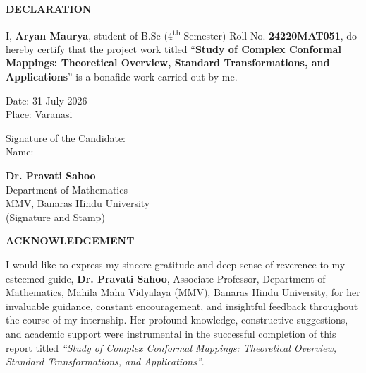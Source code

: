 \documentclass[12pt,a4paper]{article}
\begin{document}
\begin{center}
    {\Large \textbf{DECLARATION}}
\end{center}

\vspace{1.2cm}

\large

\noindent I, \textbf{Aryan Maurya}, student of B.Sc (4\textsuperscript{th} Semester) Roll No. \textbf{24220MAT051}, do hereby certify that the project work titled “\textbf{Study of Complex Conformal Mappings: Theoretical Overview, Standard Transformations, and Applications}” is a bonafide work carried out by me.

\vspace{2cm}

\noindent Date: 31 July 2026 \\[1.5em]
\noindent Place: Varanasi

\vspace{2.5cm}

\noindent
\begin{minipage}[t]{0.5\textwidth}
    Signature of the Candidate:\\[2.5em]
    Name:
\end{minipage}%
\begin{minipage}[t]{0.5\textwidth}
    \raggedleft
    \textbf{Dr. Pravati Sahoo}\\[0.3em]
    Department of Mathematics\\[0.3em]
    MMV, Banaras Hindu University\\[2em]
    (Signature and Stamp)
\end{minipage}

\clearpage

\begin{center}
    {\Large \textbf{ACKNOWLEDGEMENT}}
\end{center}

\vspace{0.8cm}


I would like to express my sincere gratitude and deep sense of reverence to my esteemed guide, \textbf{Dr. Pravati Sahoo}, Associate Professor, Department of Mathematics, Mahila Maha Vidyalaya (MMV), Banaras Hindu University, for her invaluable guidance, constant encouragement, and insightful feedback throughout the course of my internship. Her profound knowledge, constructive suggestions, and academic support were instrumental in the successful completion of this report titled \textit{“Study of Complex Conformal Mappings: Theoretical Overview, Standard Transformations, and Applications”}.
\end{document}
